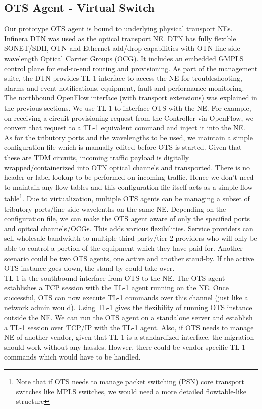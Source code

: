 \documentclass{sig-alternate-10pt}
\begin{document}
	\subsection{OTS Agent - Virtual Switch}
	\label{sec:otvs}
	Our prototype OTS agent is bound to underlying physical transport NEs. Infinera DTN \cite{dtn} was used
	as the optical transport NE. DTN has fully flexible SONET/SDH, OTN and Ethernet add/drop
	capabilities with OTN \cite{otn} line side wavelength Optical Carrier Groups (OCG). It includes an
	embedded GMPLS control plane for end-to-end routing and provisioning. As part of the management suite,
	the DTN provides TL-1 interface to access the NE for troubleshooting, alarms and event
	notifications, equipment, fault and performance monitoring. The northbound OpenFlow interface (with
	transport extensions) was explained in the previous sections. We use TL-1 to interface OTS with the NE.
	For example, on receiving a circuit provisioning request from the Controller via OpenFlow, we convert
	that request to a TL-1 equivalent command and inject it into the NE. \\

	As for the tributory ports and the wavelengths to be used, we maintain a simple configuration file which
	is manually edited before OTS is started. Given that these are TDM circuits, incoming traffic payload is
	digitally wrapped/containerized into OTN optical channels and transported. There is no header or label
	lookup to be performed on incoming traffic. Hence we don't need to maintain any flow tables and this
	configuration file itself acts as a simple flow table\footnote{Note that if OTS needs to manage packet
	switching (PSN) core transport switches like MPLS switches, we would need a more detailed flowtable-like
	structure}. Due to virtualization, multiple OTS agents can be managing a subset of tributory ports/line
	side wavelenths on the same NE. Depending on the configuration file, we can make the OTS agent aware of
	only the specified ports and opitcal channels/OCGs. This adds various flexibilities. Service providers
	can sell wholesale bandwidth to multiple third party/tier-2 providers who will only be able to control a
	portion of the equipment which they have paid for. Another scenario could be two OTS agents, one active
	and another stand-by. If the active OTS instance goes down, the stand-by could take over.\\

	TL-1 is the southbound interface from OTS to the NE. The OTS agent establishes a TCP session with
	the TL-1 agent running on the NE. Once successful, OTS can now execute TL-1 commands over this
	channel (just like a network admin would). Using TL-1 gives the flexibility of running OTS instance
	outside the NE. We can run the OTS agent on a standalone server and establish a TL-1 session over
	TCP/IP with the TL-1 agent. Also, if OTS needs to manage NE of another vendor, given that TL-1 is a
	standardized interface, the migration should work without any hassles. Howver, there could be vendor 
	specific TL-1 commands which would have to be handled.
\end{document}
